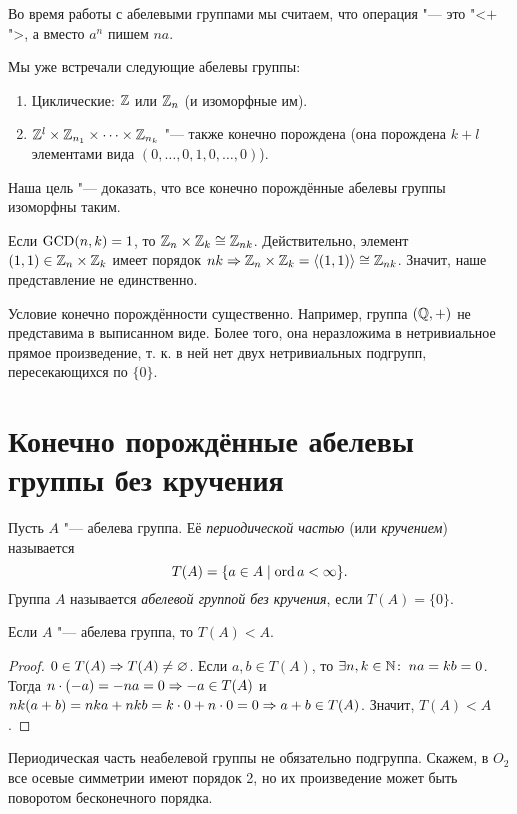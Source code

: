 \documentclass[main]{subfiles}
\begin{document}
Во время работы с абелевыми группами
мы считаем, что операция "--- это "<\( + \)">,
а вместо \( a^n \) пишем \( na \).

Мы уже встречали следующие абелевы группы:
\begin{enumerate}
  \item Циклические: \( \mathbb{Z} \) или \( \mathbb{Z}_n \)
    (и изоморфные им).
  \item \( \mathbb{Z}^l 
    \times \mathbb{Z}_{n_1} \times \dots \times \mathbb{Z}_{n_k} \) "---
    также конечно порождена
    (она порождена \( k + l \) элементами вида
    \( (0, \dots, 0, 1, 0, \dots, 0 ) \)).
\end{enumerate}

Наша цель "--- доказать, что все конечно порождённые абелевы
группы изоморфны таким.

\begin{remark}
  Если \( \operatorname{GCD}(n, k) = 1 \),
  то \( \mathbb{Z}_n \times \mathbb{Z}_k \cong \mathbb{Z}_{nk} \).
  Действительно, элемент \( (1, 1) \in \mathbb{Z}_n \times \mathbb{Z}_k \)
  имеет порядок \( nk \Rightarrow \mathbb{Z}_n \times \mathbb{Z}_k =
  \langle (1, 1) \rangle \cong \mathbb{Z}_{nk} \).
  Значит, наше представление не единственно.
\end{remark}
\begin{remark}
  Условие конечно порождённости существенно.
  Например, группа \( (\mathbb{Q}, +) \)
  не представима в выписанном виде.
  Более того, она неразложима в нетривиальное
  прямое произведение, т. к. в ней нет двух
  нетривиальных подгрупп, пересекающихся по
  \( \{ 0 \} \).
\end{remark}

\section{Конечно порождённые абелевы группы без кручения}

\begin{definition}
  Пусть \( A \) "--- абелева группа.
  Её \emph{периодической частью} (или \emph{кручением})
  называется
  \[
    T(A) = \{ a \in A \mid \operatorname{ord} a < \infty \}.
  \]
  Группа \( A \) называется \emph{абелевой группой без кручения},
  если \( T(A) =  \{ 0 \} \).
\end{definition}

\begin{proposition}
  Если \( A \) "--- абелева группа, то \( T(A) < A \).
\end{proposition}
\begin{proof}
  \( 0 \in T(A) \Rightarrow T(A) \ne \varnothing \).
  Если \( a, b \in T(A) \), то \( \exists n, k \in \mathbb{N} \colon \:
  na = kb = 0 \).
  Тогда \( n \cdot (-a) = -na = 0 \Rightarrow -a \in T(A) \) и
  \( nk (a + b) = nka + nkb = k \cdot 0 + n \cdot 0 = 0
  \Rightarrow a + b \in T(A) \).
  Значит, \( T(A) < A \).
\end{proof}
\begin{remark}
  Периодическая часть неабелевой группы не обязательно подгруппа.
  Скажем, в \( O_2 \) все осевые симметрии имеют порядок 2,
  но их произведение может быть поворотом бесконечного порядка.
\end{remark}
\end{document}
